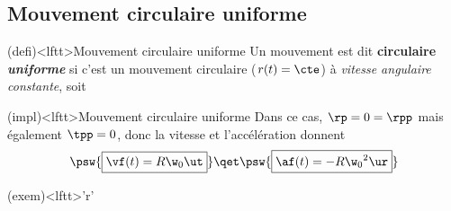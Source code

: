 \documentclass[../../main/main.tex]{subfiles}
\begin{document}
\subsection{Mouvement circulaire uniforme}

\vspace{-15pt}

\begin{tcbraster}[raster equal height=rows, raster columns=4]
	\begin{tcolorbox}[blankest, raster multicolumn=3, space to=\myspace]
		\begin{tcb*}(defi)<lftt>{Mouvement circulaire uniforme}
			Un mouvement est dit \textbf{circulaire \textit{uniforme}} si c'est un
			mouvement circulaire ($r(t) = \cte$) à \textit{vitesse angulaire
				constante}, soit
			\psw{%
				\[
					r(t) = R
					\qet
					\tp(t) = \w_0
				\]
			}%
			\vspace{-25pt}
		\end{tcb*}
		\begin{tcb}(impl)<lftt>{Mouvement circulaire uniforme}
			Dans ce cas, $\rp = 0 = \rpp$ mais également $\tpp = 0$, donc la vitesse et
			l'accélération donnent
			\[
				\psw{\boxed{\vf(t) = R\w_0\ut}}
				\qet
				\psw{\boxed{\af(t) = -R\w_0{}^2\ur}}
			\]
			\vspace{-25pt}
		\end{tcb}
	\end{tcolorbox}
	\begin{tcb}[list entry={\lte\theexem~:~Mouvement circulaire uniforme}](exem)<lftt>'r'{}
		\vspace{-25pt}
		\begin{center}
\end{center}
\end{tcb}
\end{tcbraster}
\end{document}
